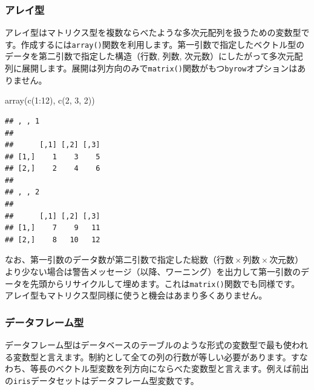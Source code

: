 \documentclass[
  12pt,
]{book}
\newenvironment{Shaded}{\begin{snugshade}}{\end{snugshade}}
\newcommand{\DecValTok}[1]{\textcolor[rgb]{0.00,0.00,0.81}{#1}}
\newcommand{\FunctionTok}[1]{\textcolor[rgb]{0.00,0.00,0.00}{#1}}
\newcommand{\NormalTok}[1]{#1}
\newcommand{\SpecialCharTok}[1]{\textcolor[rgb]{0.00,0.00,0.00}{#1}}
\begin{document}
\hypertarget{ux30a2ux30ecux30a4ux578b}{%
\subsubsection{アレイ型}\label{ux30a2ux30ecux30a4ux578b}}

アレイ型はマトリクス型を複数ならべたような多次元配列を扱うための変数型です。作成するには\texttt{array()}関数を利用します。第一引数で指定したベクトル型のデータを第二引数で指定した構造（行数, 列数, 次元数）にしたがって多次元配列に展開します。展開は列方向のみで\texttt{matrix()}関数がもつ\texttt{byrow}オプションはありません。

\begin{Shaded}
\begin{Highlighting}[numbers=left,,]
\FunctionTok{array}\NormalTok{(}\FunctionTok{c}\NormalTok{(}\DecValTok{1}\SpecialCharTok{:}\DecValTok{12}\NormalTok{), }\FunctionTok{c}\NormalTok{(}\DecValTok{2}\NormalTok{, }\DecValTok{3}\NormalTok{, }\DecValTok{2}\NormalTok{))}
\end{Highlighting}
\end{Shaded}

\begin{verbatim}
## , , 1
## 
##      [,1] [,2] [,3]
## [1,]    1    3    5
## [2,]    2    4    6
## 
## , , 2
## 
##      [,1] [,2] [,3]
## [1,]    7    9   11
## [2,]    8   10   12
\end{verbatim}

なお、第一引数のデータ数が第二引数で指定した総数（\(\mbox{行数} \times \mbox{列数} \times \mbox{次元数}\)）より少ない場合は警告メッセージ（以降、ワーニング）を出力して第一引数のデータを先頭からリサイクルして埋めます。これは\texttt{matrix()}関数でも同様です。 アレイ型もマトリクス型同様に使うと機会はあまり多くありません。

\hypertarget{ux30c7ux30fcux30bfux30d5ux30ecux30fcux30e0ux578b}{%
\subsubsection{データフレーム型}\label{ux30c7ux30fcux30bfux30d5ux30ecux30fcux30e0ux578b}}

データフレーム型はデータベースのテーブルのような形式の変数型で最も使われる変数型と言えます。制約として全ての列の行数が等しい必要があります。すなわち、等長のベクトル型変数を列方向にならべた変数型と言えます。例えば前出の\texttt{iris}データセットはデータフレーム型変数です。
\end{document}
